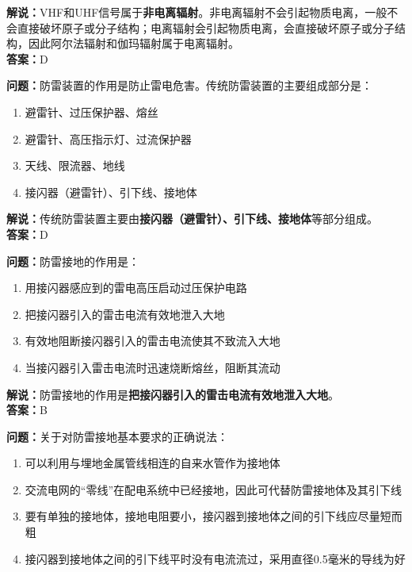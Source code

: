 \noindent\textbf{解说：}VHF和UHF信号属于\textbf{非电离辐射}。非电离辐射不会引起物质电离，一般不会直接破坏原子或分子结构；电离辐射会引起物质电离，会直接破坏原子或分子结构，因此阿尔法辐射和伽玛辐射属于电离辐射。\\\noindent\textbf{答案：}D

\bigskip


\noindent\textbf{问题：}防雷装置的作用是防止雷电危害。传统防雷装置的主要组成部分是：

\begin{enumerate}[label=\Alph*), leftmargin=3em]
	\item 避雷针、过压保护器、熔丝
	\item 避雷针、高压指示灯、过流保护器
	\item 天线、限流器、地线
	\item 接闪器（避雷针）、引下线、接地体
\end{enumerate}

\noindent\textbf{解说：}传统防雷装置主要由\textbf{接闪器（避雷针）、引下线、接地体}等部分组成。\\\noindent\textbf{答案：}D

\bigskip


\noindent\textbf{问题：}防雷接地的作用是：

\begin{enumerate}[label=\Alph*), leftmargin=3em]
	\item 用接闪器感应到的雷电高压启动过压保护电路
	\item 把接闪器引入的雷击电流有效地泄入大地
	\item 有效地阻断接闪器引入的雷击电流使其不致流入大地
	\item 当接闪器引入雷击电流时迅速烧断熔丝，阻断其流动
\end{enumerate}

\noindent\textbf{解说：}防雷接地的作用是\textbf{把接闪器引入的雷击电流有效地泄入大地}。\\\noindent\textbf{答案：}B


\bigskip


\noindent\textbf{问题：}关于对防雷接地基本要求的正确说法：

\begin{enumerate}[label=\Alph*), leftmargin=3em]
	\item 可以利用与埋地金属管线相连的自来水管作为接地体
	\item 交流电网的“零线”在配电系统中已经接地，因此可代替防雷接地体及其引下线
	\item 要有单独的接地体，接地电阻要小，接闪器到接地体之间的引下线应尽量短而粗
	\item 接闪器到接地体之间的引下线平时没有电流流过，采用直径0.5毫米的导线为好
\end{enumerate}

